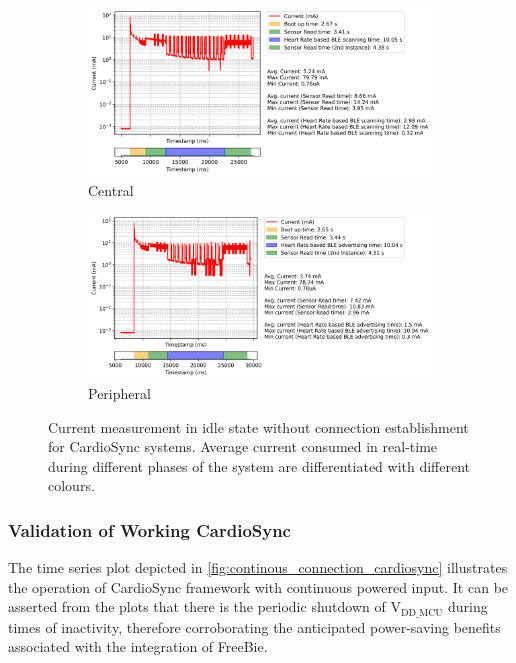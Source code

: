 \begin{figure}[ht]
    \centering
    \begin{subfigure}{0.8\linewidth}        
        \centering
        \includegraphics[width=\linewidth]{chapters/Results/Current vs Timestamp - CardioSync Central.png}
        \caption{Central}
        \label{fig:current_cardiosync_central}
        \vspace{1\baselineskip}
    \end{subfigure}
    \begin{subfigure}{0.8\linewidth}    
        \centering
        \includegraphics[width=\linewidth]{chapters/Results/Current vs Timestamp - CardioSync Peripheral.png}
        \caption{Peripheral}
        \label{fig:current_cardiosync_peripheral}
    \end{subfigure}
    \caption{Current measurement in idle state without connection establishment for CardioSync systems. Average current consumed in real-time during different phases of the system are differentiated with different colours.}
    \label{fig:current_cardiosync}
\end{figure}

\subsubsection{Validation of Working CardioSync}
The time series plot depicted in \autoref{fig:continous_connection_cardiosync} illustrates the operation of CardioSync framework with continuous powered input. It can be asserted from the plots that there is the periodic shutdown of \(\text{V}_\text{DD\_MCU}\) during times of inactivity, therefore corroborating the anticipated power-saving benefits associated with the integration of FreeBie.
\vspace{1\baselineskip}

